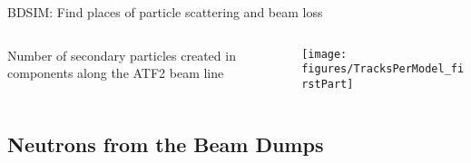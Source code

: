 \documentclass[xcolor={dvipsnames}]{beamer}
\begin{document}
\begin{frame}{BDSIM: Find places of particle scattering and beam loss}
  \begin{columns}
  \begin{column}{0.3\textwidth}
   Number of secondary particles created in components along the ATF2 beam line
  \end{column}
  \begin{column}{0.7\textwidth}
   \texttt{[image: figures/TracksPerModel\_firstPart]}
  \end{column}
 \end{columns}
\end{frame}


\subsection{Neutrons from the Beam Dumps}

\end{document}
